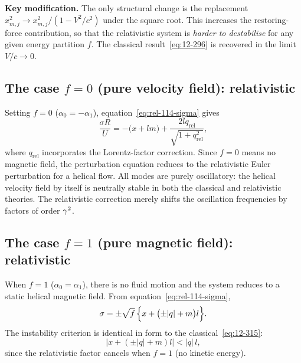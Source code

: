 \begin{relcorrection}
\textbf{Key modification.}
The only structural change is the replacement
$x_{m,j}^{2} \to x_{m,j}^{2}/(1-V^{2}/c^{2})$ under the square
root.  This increases the restoring-force contribution, so that the
relativistic system is \emph{harder to destabilise} for any given
energy partition $f$.  The classical result~\eqref{eq:12-296} is
recovered in the limit $V/c \to 0$.
\end{relcorrection}

\subsection{The case $f = 0$ (pure velocity field): relativistic}
\label{sec:rel-114-f0}

Setting $f = 0$ ($\alpha_{0} = -\alpha_{1}$),
equation~\eqref{eq:rel-114-sigma} gives
\begin{equation}
\label{eq:rel-114-f0-sigma}
\frac{\sigma R}{U}
  = -\bigl(x + lm\bigr)
  + \frac{2lq_{\mathrm{rel}}}{\sqrt{1 + q_{\mathrm{rel}}^{2}}},
\end{equation}
where $q_{\mathrm{rel}}$ incorporates the Lorentz-factor correction.
Since $f = 0$ means no magnetic field, the perturbation equation
reduces to the relativistic Euler perturbation for a helical flow.
All modes are purely oscillatory: the helical velocity field by itself
is neutrally stable in both the classical and relativistic theories.
The relativistic correction merely shifts the oscillation frequencies
by factors of order $\gamma^{2}$.

\subsection{The case $f = 1$ (pure magnetic field): relativistic}
\label{sec:rel-114-f1}

When $f = 1$ ($\alpha_{0} = \alpha_{1}$), there is no fluid motion and
the system reduces to a static helical magnetic field.  From
equation~\eqref{eq:rel-114-sigma},
\begin{equation}
\label{eq:rel-114-f1-sigma}
\sigma = \pm\sqrt{f}\,
  \Bigl\{x + \bigl(\pm|q| + m\bigr)l\Bigr\}.
\end{equation}
The instability criterion is identical in form to the
classical~\eqref{eq:12-315}:
\begin{equation}
\label{eq:rel-114-f1-crit}
\bigl|x + (\pm|q|+m)l\bigr| < |q|\,l,
\end{equation}
since the relativistic factor cancels when $f = 1$ (no kinetic energy).


